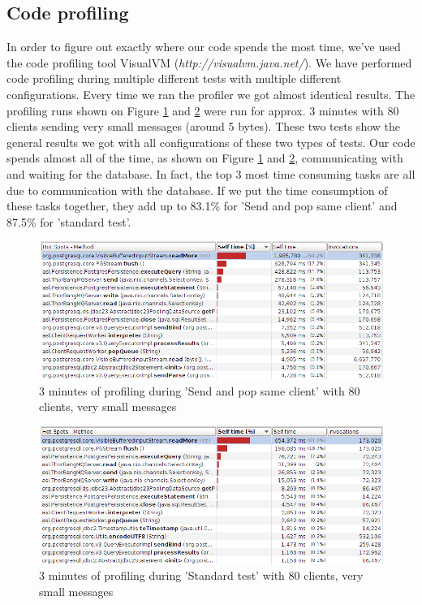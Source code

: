 \documentclass{article}
\begin{document}
        \subsection{Code profiling}
            In order to figure out exactly where our code spends the most time, we've used the code profiling tool VisualVM (\textit{http://visualvm.java.net/}). We have performed code profiling during multiple different tests with multiple different configurations. Every time we ran the profiler we got almost identical results. The profiling runs shown on Figure \ref{fig:code_profiling_send_pop_same_client} and \ref{fig:code_profiling_standard_test} were run for approx. 3 minutes with 80 clients sending very small messages (around 5 bytes). These two tests show the general results we got with all configurations of these two types of tests. Our code spends almost all of the time, as shown on Figure \ref{fig:code_profiling_send_pop_same_client} and \ref{fig:code_profiling_standard_test}, communicating with and waiting for the database. In fact, the top 3 most time consuming tasks are all due to communication with the database. If we put the time consumption of these tasks together, they add up to 83.1\% for 'Send and pop same client' and 87.5\% for 'standard test'.
            \begin{figure}[H]
                \hspace{-1.5cm}
                \includegraphics[scale=0.50]{code_profiling_send_pop_same_client}
                \caption{3 minutes of profiling during 'Send and pop same client' with 80 clients, very small messages}
                \label{fig:code_profiling_send_pop_same_client}
            \end{figure}
            \begin{figure}[H]
                \hspace{-1.5cm}
                \includegraphics[scale=0.50]{code_profiling_standard_test}
                \caption{3 minutes of profiling during 'Standard test' with 80 clients, very small messages}
                \label{fig:code_profiling_standard_test}
            \end{figure}
\end{document}
